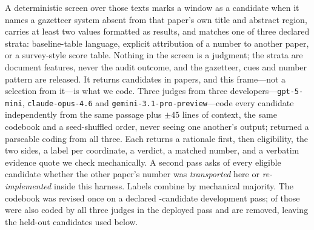 \documentclass[11pt]{article}
\begin{document}
A deterministic screen over those texts marks a window as a candidate when it
names a gazetteer system absent from that paper's own title and abstract region,
carries at least two values formatted as results, and matches one of three
declared strata: baseline-table language, explicit attribution of a number to
another paper, or a survey-style score table. Nothing in the screen is a
judgment; the strata are document features, never the audit outcome, and the
gazetteer, cues and number pattern are released. It returns \FrameCandidates{}
candidates in \FrameFiles{} papers, and this frame---not a selection from
it---is what we code. Three judges from three
developers---\texttt{gpt-5-mini}, \texttt{claude-opus-4.6} and
\texttt{gemini-3.1-pro-preview}---code every candidate independently from the
same passage plus $\pm45$ lines of context, the same codebook and a
seed-shuffled order, never seeing one another's output; \CensusCodedAll{}
returned a parseable coding from all three. Each returns a rationale first, then
eligibility, the two sides, a label per coordinate, a verdict, a matched number,
and a verbatim evidence quote we check mechanically. A second pass asks of every
eligible candidate whether the other paper's number was \emph{transported} here
or \emph{re-implemented} inside this harness. Labels combine by mechanical
majority. The codebook was revised once on a declared
\CensusDevSize{}-candidate development pass; \CensusDevCoded{} of those were
also coded by all three judges in the deployed pass and are removed, leaving the
\CensusHeldout{} held-out candidates used below.


\end{document}
